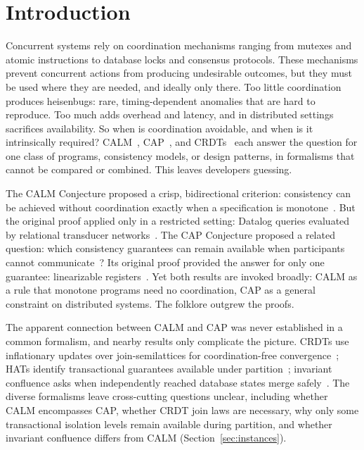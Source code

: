 \section{Introduction}
\label{sec:intro}

Concurrent systems rely on coordination mechanisms ranging from mutexes and
atomic instructions to database locks and consensus protocols.  These mechanisms
prevent concurrent actions from producing undesirable outcomes, but they must be
used where they are needed, and ideally only there.  Too little coordination
produces heisenbugs: rare, timing-dependent anomalies that are hard to
reproduce.  Too much adds overhead and latency, and in distributed settings
sacrifices availability.  So when is coordination avoidable, and when is it
intrinsically required?  CALM~\cite{ameloot2013relational},
CAP~\cite{gilbert2002cap}, and CRDTs~\cite{shapiro2011crdt} each answer the
question for one class of programs, consistency models, or design patterns, in
formalisms that cannot be compared or combined.  This leaves developers
guessing.

The CALM Conjecture proposed a crisp, bidirectional criterion:
consistency can be achieved without coordination exactly when a specification
is monotone~\cite{hellerstein2010declarative}.  But the original proof applied
only in a restricted setting: Datalog queries evaluated by relational transducer
networks~\cite{ameloot2013relational,hellerstein2020keeping}.  The CAP
Conjecture proposed a related question: which consistency guarantees can remain
available when participants cannot
communicate~\cite{brewer2000towards,brewer2012cap}?  Its original proof
provided the answer for only one guarantee: linearizable
registers~\cite{gilbert2002cap}.  Yet both results are invoked broadly: CALM as a
rule that monotone programs need no coordination, CAP as a general constraint
on distributed systems. The folklore outgrew the proofs.

The apparent connection between CALM and CAP was never established in a common
formalism, and nearby results only complicate the picture. CRDTs use
inflationary updates over join-semilattices for coordination-free
convergence~\cite{shapiro2011crdt}; HATs identify transactional guarantees
available under partition~\cite{bailis2013hat}; invariant confluence asks when
independently reached database states merge
safely~\cite{bailis2014coordination}. The diverse formalisms leave cross-cutting
questions unclear, including whether CALM encompasses CAP, whether CRDT join
laws are necessary, why only some transactional isolation levels remain
available during partition, and whether invariant confluence differs from CALM
(Section~\ref{sec:instances}).

